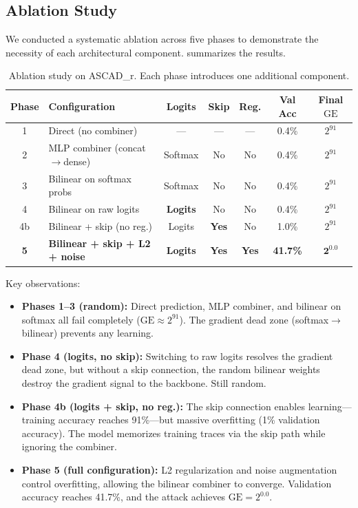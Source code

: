 \documentclass[submission]{iacrtrans}
\newcommand{\GE}{\mathrm{GE}}
\begin{document}
\subsection{Ablation Study}\label{sec:ablation}

We conducted a systematic ablation across five phases to demonstrate the necessity of each architectural component.  summarizes the results.

\begin{table}[t]
  \centering
  \caption{Ablation study on ASCAD\_r. Each phase introduces one additional component.}
  \label{tab:ablation}
  \small
  \begin{tabular}{clccccc}
    \toprule
    \textbf{Phase} & \textbf{Configuration} & \textbf{Logits} & \textbf{Skip} & \textbf{Reg.} & \textbf{Val Acc} & \textbf{Final $\GE$} \\
    \midrule
    1 & Direct (no combiner) & --- & --- & --- & 0.4\% & $2^{91}$ \\
    2 & MLP combiner (concat$\to$dense) & Softmax & No & No & 0.4\% & $2^{91}$ \\
    3 & Bilinear on softmax probs & Softmax & No & No & 0.4\% & $2^{91}$ \\
    4 & Bilinear on raw logits & \textbf{Logits} & No & No & 0.4\% & $2^{91}$ \\
    4b & Bilinear + skip (no reg.) & Logits & \textbf{Yes} & No & 1.0\% & $2^{91}$ \\
    \textbf{5} & \textbf{Bilinear + skip + L2 + noise} & \textbf{Logits} & \textbf{Yes} & \textbf{Yes} & \textbf{41.7\%} & $\bm{2^{0.0}}$ \\
    \bottomrule
  \end{tabular}
\end{table}

Key observations:
\begin{itemize}[leftmargin=*]
  \item \textbf{Phases 1--3 (random):} Direct prediction, MLP combiner, and bilinear on softmax all fail completely ($\GE \approx 2^{91}$). The gradient dead zone (softmax$\to$bilinear) prevents any learning.

  \item \textbf{Phase 4 (logits, no skip):} Switching to raw logits resolves the gradient dead zone, but without a skip connection, the random bilinear weights destroy the gradient signal to the backbone. Still random.

  \item \textbf{Phase 4b (logits + skip, no reg.):} The skip connection enables learning---training accuracy reaches 91\%---but massive overfitting (1\% validation accuracy). The model memorizes training traces via the skip path while ignoring the combiner.

  \item \textbf{Phase 5 (full configuration):} L2 regularization and noise augmentation control overfitting, allowing the bilinear combiner to converge. Validation accuracy reaches 41.7\%, and the attack achieves $\GE = 2^{0.0}$.
\end{itemize}
\end{document}

